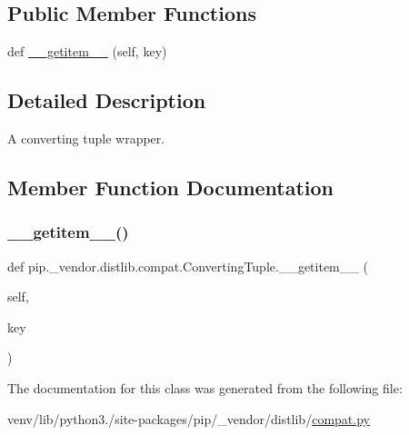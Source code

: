 \subsection*{Public Member Functions}
\begin{DoxyCompactItemize}
\item 
def \hyperlink{classpip_1_1__vendor_1_1distlib_1_1compat_1_1ConvertingTuple_a86402bfe83227d531341d1dd8a693b62}{\+\_\+\+\_\+getitem\+\_\+\+\_\+} (self, key)
\end{DoxyCompactItemize}


\subsection{Detailed Description}
\begin{DoxyVerb}A converting tuple wrapper.\end{DoxyVerb}
 

\subsection{Member Function Documentation}
\mbox{\label{classpip_1_1__vendor_1_1distlib_1_1compat_1_1ConvertingTuple_a86402bfe83227d531341d1dd8a693b62}} 
\subsubsection{\texorpdfstring{\+\_\+\+\_\+getitem\+\_\+\+\_\+()}{\_\_getitem\_\_()}}
{\footnotesize\ttfamily def pip.\+\_\+vendor.\+distlib.\+compat.\+Converting\+Tuple.\+\_\+\+\_\+getitem\+\_\+\+\_\+ (\begin{DoxyParamCaption}\item[{}]{self,  }\item[{}]{key }\end{DoxyParamCaption})}



The documentation for this class was generated from the following file\+:\begin{DoxyCompactItemize}
\item 
venv/lib/python3./site-\/packages/pip/\+\_\+vendor/distlib/\hyperlink{__vendor_2distlib_2compat_8py}{compat.\+py}\end{DoxyCompactItemize}
